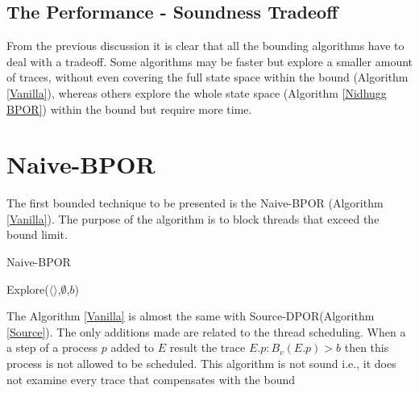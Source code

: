 \subsection {The Performance - Soundness Tradeoff}

From the previous discussion it is clear that all the bounding algorithms have to deal with a tradeoff. Some algorithms may be faster but
explore a smaller amount of traces, without even covering the full state space within the bound (Algorithm \ref{Vanilla}), 
whereas others explore the whole state space (Algorithm \ref{Nidhugg BPOR}) within the bound but require more time.


\section{Naive-BPOR}

The first bounded technique to be presented is the Naive-BPOR (Algorithm \ref{Vanilla}). The purpose of the algorithm is to block threads that exceed the bound
limit. 

\begin{algorithm}
    \caption{Naive-BPOR}
    \label{Vanilla}
    Explore($\langle \rangle$,$\emptyset$,$b$)\;
\end{algorithm}

The Algorithm \ref{Vanilla} is almost the same with Source-DPOR(Algorithm \ref{Source}). The only additions made are related to the 
thread scheduling. When a a step of a process $p$ added to $E$ result the trace $E.p : B_v(E.p) > b$ then this process is not allowed to be scheduled.
This algorithm is not sound i.e., it does not examine every trace that compensates with the bound

